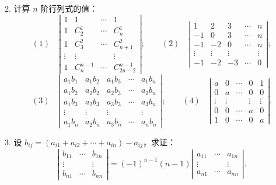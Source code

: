 \documentclass[UTF8,12pt,a4paper,fontset=fandol]{ctexart}
\begin{document}
2. 计算 $n$ 阶行列式的值：
\[
(1)\quad
\left|\begin{array}{cccc}
1 & 1 & \cdots & 1\\
1 & C_2^1 & \cdots & C_n^1\\
1 & C_3^2 & \cdots & C_{n+1}^2\\
\vdots & \vdots & & \vdots\\
1 & C_n^{n-1} & \cdots & C_{2n-2}^{n-1}
\end{array}\right|;
\qquad
(2)\quad
\left|\begin{array}{ccccc}
1 & 2 & 3 & \cdots & n\\
-1 & 0 & 3 & \cdots & n\\
-1 & -2 & 0 & \cdots & n\\
\vdots & \vdots & \vdots & & \vdots\\
-1 & -2 & -3 & \cdots & 0
\end{array}\right|;
\]
\[
(3)\quad
\left|\begin{array}{ccccc}
a_1b_1 & a_1b_2 & a_1b_3 & \cdots & a_1b_n\\
a_1b_2 & a_2b_2 & a_2b_3 & \cdots & a_2b_n\\
a_1b_3 & a_2b_3 & a_3b_3 & \cdots & a_3b_n\\
\vdots & \vdots & \vdots & & \vdots\\
a_1b_n & a_2b_n & a_3b_n & \cdots & a_nb_n
\end{array}\right|;
\qquad
(4)\quad
\left|\begin{array}{ccccc}
a & 0 & \cdots & 0 & 1\\
0 & a & \cdots & 0 & 0\\
\vdots & \vdots & & \vdots & \vdots\\
0 & 0 & \cdots & a & 0\\
1 & 0 & \cdots & 0 & a
\end{array}\right|.
\]

3. 设 $b_{ij}=(a_{i1}+a_{i2}+\cdots+a_{in})-a_{ij}$，求证：
\[
\left|\begin{array}{ccc}
b_{11} & \cdots & b_{1n}\\
\vdots & & \vdots\\
b_{n1} & \cdots & b_{nn}
\end{array}\right|
=(-1)^{n-1}(n-1)
\left|\begin{array}{ccc}
a_{11} & \cdots & a_{1n}\\
\vdots & & \vdots\\
a_{n1} & \cdots & a_{nn}
\end{array}\right|.
\]
\end{document}
